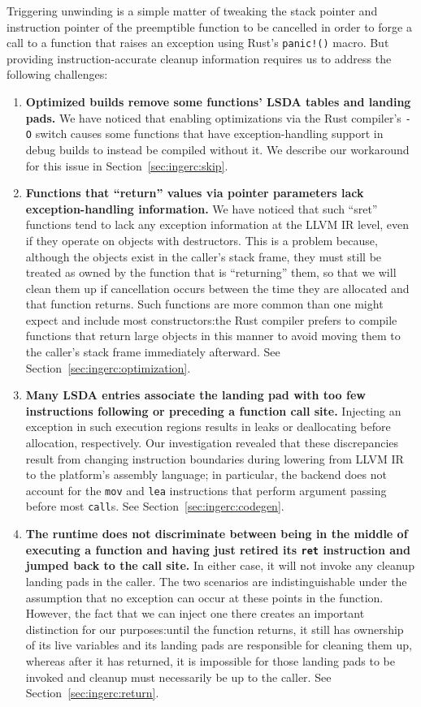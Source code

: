 Triggering unwinding is a simple matter of tweaking the stack pointer and
instruction pointer of the preemptible function to be cancelled in order to forge a
call to a function that raises an exception using Rust's \texttt{panic!()} macro.
But providing instruction-accurate cleanup information requires us to address the
following challenges:
\begin{enumerate}
\item \textbf{Optimized builds remove some functions' LSDA tables and landing pads.}
We have noticed that enabling optimizations via the Rust compiler's \texttt{-O}
switch causes some functions that have exception-handling support in debug builds to
instead be compiled without it.  We describe our workaround for this issue in
Section~\ref{sec:ingerc:skip}.

\item \textbf{Functions that ``return'' values via pointer parameters lack
exception-handling information.}  We have noticed that such ``sret'' functions tend
to lack any exception information at the LLVM IR level, even if they operate on
objects with destructors.  This is a problem because, although the objects exist in
the caller's stack frame, they must still be treated as owned by the function that is
``returning'' them, so that we will clean them up if cancellation occurs between the
time they are allocated and that function returns.  Such functions are more common
than one might expect and include most constructors:\@ the Rust compiler prefers to
compile functions that return large objects in this manner to avoid moving them to
the caller's stack frame immediately afterward.  See
Section~\ref{sec:ingerc:optimization}.

\item \textbf{Many LSDA entries associate the landing pad with too few instructions
following or preceding a function call site.}  Injecting
an exception in such execution regions results in leaks or deallocating before
allocation, respectively.  Our investigation revealed that these discrepancies result
from changing instruction boundaries during lowering from LLVM IR to the platform's
assembly language; in particular, the backend does not account for the \texttt{mov}
and \texttt{lea} instructions that perform argument passing before most
\texttt{call}s. See Section~\ref{sec:ingerc:codegen}.

\item \textbf{The runtime does not discriminate between being in the middle of
executing a function and having just retired its \texttt{ret} instruction and jumped
back to the call site.}  In either case, it will not invoke any cleanup landing pads
in the caller.  The two scenarios are indistinguishable under the assumption that no
exception can occur at these points in the function.  However, the fact that we can
inject one there creates an important distinction for our purposes:\@ until the
function returns, it still has ownership of its live variables and its landing pads
are responsible for cleaning them up, whereas after it has returned, it is impossible
for those landing pads to be invoked and cleanup must necessarily be up to the
caller.  See Section~\ref{sec:ingerc:return}.


\end{enumerate}

